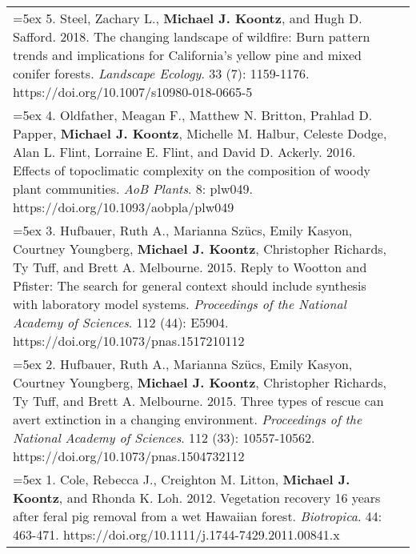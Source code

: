\begin{longtable}{@{} >{\raggedright}p{5.25in} >{\raggedleft}X @{}}
\hangindent=5ex 5. Steel, Zachary L., \textbf{Michael J. Koontz}, and Hugh D. Safford. 2018. The changing landscape of wildfire: Burn pattern trends and implications for California's yellow pine and mixed conifer forests. \emph{Landscape Ecology}. 33 (7): 1159-1176. https://doi.org/10.1007/s10980-018-0665-5 & 2018 \tabularnewline

\hangindent=5ex 4. Oldfather, Meagan F., Matthew N. Britton, Prahlad D. Papper, \textbf{Michael J. Koontz}, Michelle M. Halbur, Celeste Dodge, Alan L. Flint, Lorraine E. Flint, and David D. Ackerly. 2016. Effects of topoclimatic complexity on the composition of woody plant communities. \emph{AoB Plants}. 8: plw049. https://doi.org/10.1093/aobpla/plw049 & 2016 \tabularnewline

\hangindent=5ex 3. Hufbauer, Ruth A., Marianna Sz\"ucs, Emily Kasyon, Courtney Youngberg, \textbf{Michael J. Koontz}, Christopher Richards, Ty Tuff, and Brett A. Melbourne. 2015. Reply to Wootton and Pfister: The search for general context should include synthesis with laboratory model systems. \emph{Proceedings of the National Academy of Sciences}. 112 (44): E5904. https://doi.org/10.1073/pnas.1517210112 & 2015 \tabularnewline

\hangindent=5ex 2. Hufbauer, Ruth A., Marianna Sz\"ucs, Emily Kasyon, Courtney Youngberg, \textbf{Michael J. Koontz}, Christopher Richards, Ty Tuff, and Brett A. Melbourne. 2015. Three types of rescue can avert extinction in a changing environment. \emph{Proceedings of the National Academy of Sciences}. 112 (33): 10557-10562. https://doi.org/10.1073/pnas.1504732112 & 2015 \tabularnewline

\hangindent=5ex 1. Cole, Rebecca J., Creighton M. Litton, \textbf{Michael J. Koontz}, and Rhonda K. Loh. 2012. Vegetation recovery 16 years after feral pig removal from
a wet Hawaiian forest. \emph{Biotropica}. 44: 463-471. https://doi.org/10.1111/j.1744-7429.2011.00841.x & 2012 \tabularnewline

\end{longtable}
